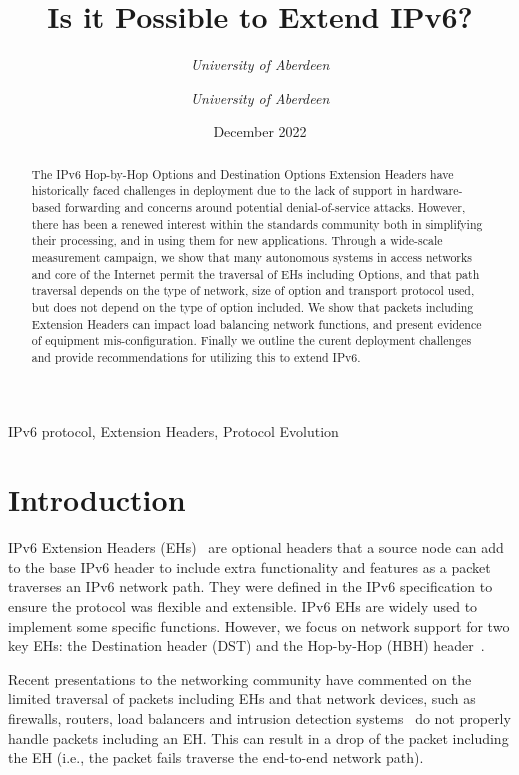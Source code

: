\documentclass[conference]{IEEEtran}
\title{Is it Possible to Extend IPv6?}
\date{December 2022}
\author{\IEEEauthorblockN{Ana Custura}
\IEEEauthorblockA{
\textit{University of Aberdeen}\\
}
\and
\IEEEauthorblockN{Raffaello Secchi}
\textit{University of Aberdeen}\\
\and
\IEEEauthorblockN{Gorry Fairhurst}
\textit{University of Aberdeen}\\
}
\begin{document}
\maketitle

\begin{abstract}
The IPv6 Hop-by-Hop Options and Destination Options Extension Headers have historically faced challenges in deployment due to the lack of support in hardware-based forwarding and concerns around potential denial-of-service attacks. However, there has been a renewed interest within the standards community both in simplifying their processing, and in using them for new applications. 
Through a wide-scale measurement campaign, we show that many autonomous systems in access networks and core of the Internet permit the traversal of EHs including Options, and that path traversal depends on the type of network, size of option and transport protocol used, but does not depend on the type of option included. We show that packets including Extension Headers can impact load balancing network functions, and present evidence of equipment mis-configuration. Finally we outline the curent deployment challenges  and provide recommendations for utilizing this to extend IPv6.

\end{abstract}

\begin{IEEEkeywords}
IPv6 protocol, Extension Headers, Protocol Evolution
\end{IEEEkeywords}

\section{Introduction}
\label{sec:introduction}

IPv6 Extension Headers (EHs)~\cite{RFC8200} are optional headers that a source node can
add to the base IPv6 header to include extra functionality and features as a packet traverses an IPv6 network path. They were defined in the IPv6 specification
to ensure the protocol was flexible and extensible.
IPv6 EHs are widely used to implement some specific functions. 
However, we focus on network support for two key EHs: the Destination header (DST) and the Hop-by-Hop (HBH) header~\cite{rfc9098}. 

Recent presentations to the networking community have commented on the limited traversal of packets including EHs and that network devices, such as firewalls, routers, load balancers and intrusion detection systems~\cite{nalini-iepg114, fernando-talk} do not properly handle packets including an EH. This can result in a drop of the packet including the EH (i.e., the packet fails traverse the end-to-end network path).
\end{document}
